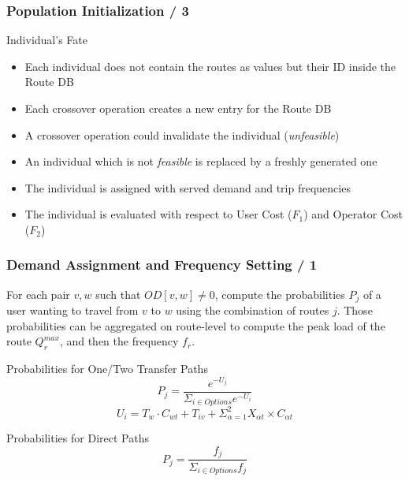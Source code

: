 \documentclass[dvipsnames]{beamer}
\begin{document}
\begin{frame}
  \frametitle{Population Initialization / 3}
  \begin{block}{Individual's Fate}
    \begin{itemize}
      \item Each individual does not contain the routes as values but their ID inside the Route DB
      \item Each crossover operation creates a new entry for the Route DB
      \item A crossover operation could invalidate the individual (\textit{unfeasible})
      \item An individual which is not \textit{feasible} is replaced by a freshly generated one
      \item The individual is assigned with served demand and trip frequencies
      \item The individual is evaluated with respect to User Cost ($F_1$) and Operator Cost ($F_2$)
    \end{itemize}
  \end{block}
\end{frame}

\begin{frame}
  \frametitle{Demand Assignment and Frequency Setting / 1}

  For each pair $v, w$ such that $OD[v, w] \neq 0$, compute the probabilities $P_{j}$ of a user wanting to travel from $v$ to $w$ using the combination of routes $j$.
  Those probabilities can be aggregated on route-level to compute the peak load of the route $Q^{max}_{r}$, and then the frequency $f_r$.
  
  \begin{block}{Probabilities for One/Two Transfer Paths}
    \begin{equation}
      \label{eq:POTTP}
      P_{j} = \frac {e^{-U_j}} {\Sigma _ {i \in Options} e ^ {-U_i}}
    \end{equation}
    \begin{equation}
      \label{eq:UOTTP}
      U_i = T_w \cdot C_{wt} + T_{iv} + \Sigma _ {\alpha = 1} ^ {2} X_{\alpha t} \times C_{\alpha t}
    \end{equation}
  \end{block}
  
  \begin{block}{Probabilities for Direct Paths}
    \begin{equation}
      \label{eq:PDP}
      P_{j} = \frac {f_j} {\Sigma _ {i \in Options} f_j}
    \end{equation}
  \end{block}
\end{frame}
\end{document}
